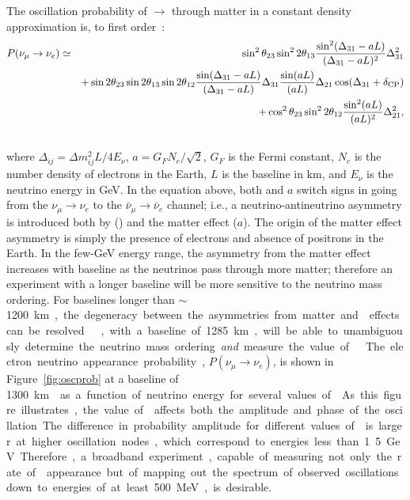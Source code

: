 The oscillation probability of \numu $\rightarrow$ \nue through matter in a constant density
approximation is,  %
to first order~\cite{Nunokawa:2007qh}:
%
\begin{eqnarray}
P(\nu_\mu \rightarrow \nu_e) & \simeq & \sin^2 \theta_{23} \sin^2 2 \theta_{13} 
\frac{ \sin^2(\Delta_{31} - aL)}{(\Delta_{31}-aL)^2} \Delta_{31}^2\\ \nonumber
& & + \sin 2 \theta_{23} \sin 2 \theta_{13} \sin 2 \theta_{12} \frac{ \sin(\Delta_{31} - aL)}{(\Delta_{31}-aL)} \Delta_{31} \frac{\sin(aL)}{(aL)} \Delta_{21} \cos (\Delta_{31} + \delta_{\rm CP})\\ \nonumber
& & + \cos^2 \theta_{23} \sin^2 2 \theta_{12} \frac {\sin^2(aL)}{(aL)^2} \Delta_{21}^2, \\ \nonumber
\label{eqn:appprob}
\end{eqnarray}
where $\Delta_{ij} = \Delta m^2_{ij} L/4E_\nu$, $a = G_FN_e/\sqrt{2}$, $G_F$ is the Fermi constant, $N_e$ is the number density of electrons in the Earth, $L$ is the baseline in km, and $E_\nu$ is the neutrino energy in GeV. 
In the equation above, both \deltacp and $a$ 
switch signs in going from the
$\nu_\mu \to \nu_e$ to the $\bar{\nu}_\mu \to \bar{\nu}_e$ channel; i.e.,
a neutrino-antineutrino asymmetry is introduced both by  (\deltacp)
and the matter effect ($a$). The origin of the matter effect asymmetry 
is simply the presence of electrons and absence of positrons in the Earth.  
In the few-GeV energy range, the asymmetry from the matter effect increases with baseline as the neutrinos
pass through more matter; therefore an experiment with a longer baseline will be
more sensitive to the neutrino mass ordering. For baselines longer than 
$\sim$\SI{1200}\km, the degeneracy between the asymmetries from matter
and  effects can be resolved~\cite{Bass:2013vcg}. , with a baseline of  \SI{1285}\km, 
will be able to unambiguously
determine the neutrino mass ordering \textit{and} measure the value of \deltacp~\cite{Diwan:2004bt}. 

The electron neutrino appearance probability, $P(\nu_\mu \rightarrow \nu_e)$, 
is shown in 
Figure~\ref{fig:oscprob} at a baseline of \SI{1300}\km{} as a function of neutrino 
energy for several values of \deltacp. As this figure illustrates, the value 
of \deltacp affects both the amplitude and phase of
the oscillation. The difference in probability amplitude
for different values of \deltacp is larger at higher oscillation nodes, which 
correspond to energies less than 1.5~GeV. Therefore, a broadband experiment, 
capable of measuring not only the rate of \nue appearance but of mapping out the 
spectrum of observed oscillations down to energies of at least 500~MeV, is desirable. 

